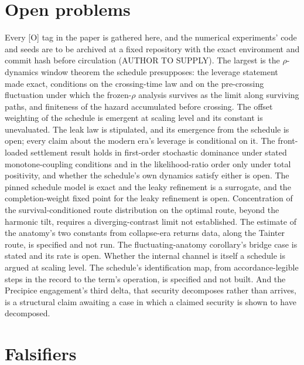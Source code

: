 \section{Open problems}\label{sec:open}

Every [O] tag in the paper is gathered here, and the numerical
experiments' code and seeds are to be archived at a fixed repository
with the exact environment and commit hash before circulation (AUTHOR
TO SUPPLY). The largest is the
$\rho$-dynamics window theorem the schedule presupposes: the leverage
statement made exact, conditions on the crossing-time law and on the
pre-crossing fluctuation under which the frozen-$\rho$ analysis survives
as the limit along surviving paths, and finiteness of the hazard
accumulated before crossing. The
offset weighting of the schedule is emergent at scaling level and its
constant is unevaluated. The leak law is stipulated, and its emergence
from the schedule is open; every claim about the modern era's leverage
is conditional on it. The front-loaded settlement result holds in first-order stochastic
dominance under stated monotone-coupling conditions and in the
likelihood-ratio order only under total positivity, and whether the
schedule's own dynamics satisfy either is open. The pinned schedule
model is exact and the leaky refinement is a surrogate, and the
completion-weight fixed point for the leaky refinement is open.
Concentration of the survival-conditioned route distribution on the
optimal route, beyond the harmonic tilt, requires a diverging-contrast
limit not established. The estimate
of the anatomy's two constants from collapse-era returns data, along the
Tainter route, is specified and not run. The fluctuating-anatomy
corollary's bridge case is stated and its rate is open. Whether the
internal channel is itself a schedule is argued at scaling level. The
schedule's identification map, from accordance-legible steps in the
record to the term's operation, is specified and not built. And the
Precipice engagement's third delta, that security decomposes rather than
arrives, is a structural claim awaiting a case in which a claimed security
is shown to have decomposed.

\section{Falsifiers}\label{sec:falsifiers}

